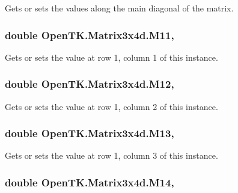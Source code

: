 Gets or sets the values along the main diagonal of the matrix. 

\hypertarget{struct_open_t_k_1_1_matrix3x4d_addeb2fcf84838d05bf7e900bc422d99a}{
\subsubsection[{M11}]{\setlength{\rightskip}{0pt plus 5cm}double Open\-T\-K.\-Matrix3x4d.\-M11\hspace{0.3cm}{\ttfamily [get]}, {\ttfamily [set]}}}\label{struct_open_t_k_1_1_matrix3x4d_addeb2fcf84838d05bf7e900bc422d99a}


Gets or sets the value at row 1, column 1 of this instance. 

\hypertarget{struct_open_t_k_1_1_matrix3x4d_a838b2ce61898d2b5e5b1397ea63b0c1a}{
\subsubsection[{M12}]{\setlength{\rightskip}{0pt plus 5cm}double Open\-T\-K.\-Matrix3x4d.\-M12\hspace{0.3cm}{\ttfamily [get]}, {\ttfamily [set]}}}\label{struct_open_t_k_1_1_matrix3x4d_a838b2ce61898d2b5e5b1397ea63b0c1a}


Gets or sets the value at row 1, column 2 of this instance. 

\hypertarget{struct_open_t_k_1_1_matrix3x4d_a4898ead8e9a56643186dcffea709412c}{
\subsubsection[{M13}]{\setlength{\rightskip}{0pt plus 5cm}double Open\-T\-K.\-Matrix3x4d.\-M13\hspace{0.3cm}{\ttfamily [get]}, {\ttfamily [set]}}}\label{struct_open_t_k_1_1_matrix3x4d_a4898ead8e9a56643186dcffea709412c}


Gets or sets the value at row 1, column 3 of this instance. 

\hypertarget{struct_open_t_k_1_1_matrix3x4d_afd9339e45cf4ca9f844f9eaf02135312}{
\subsubsection[{M14}]{\setlength{\rightskip}{0pt plus 5cm}double Open\-T\-K.\-Matrix3x4d.\-M14\hspace{0.3cm}{\ttfamily [get]}, {\ttfamily [set]}}}\label{struct_open_t_k_1_1_matrix3x4d_afd9339e45cf4ca9f844f9eaf02135312}


